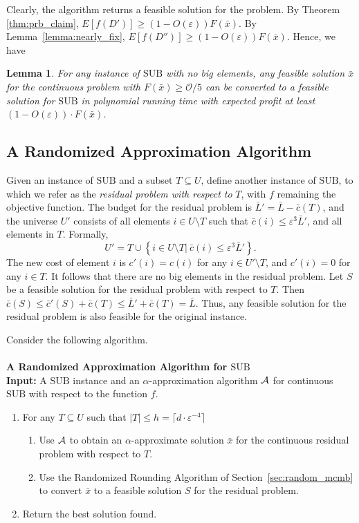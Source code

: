 \documentclass[11pt]{article}
\newtheorem{lemma}[theorem]{Lemma}
\newcommand{\eps}{\varepsilon}
\newcommand{\ceil}[1]{\lceil #1 \rceil }
\newcommand{\bx}{\bar{x}}
\newcommand{\cA}{{\cal A}}
\newcommand{\bL}{\bar{L}}
\newcommand{\bc}{\bar{c}}
\newcommand{\mO}{\mathcal{O}}
\newcommand{\SUB}{\mbox{SUB}}
\begin{document}
{Clearly, the algorithm returns a feasible solution for the problem.
By Theorem \ref{thm:prb_claim}, $E[f(D')] \geq (1- O(\eps)) F(\bar{x})$. By
Lemma~\ref{lemma:nearly_fix},
$E[f(D'')] \geq (1- O(\eps)) F(\bar{x})$. Hence, we have

\begin{lemma}
\label{thm:nobig_alg}
For any instance of $\SUB$ with no big elements,
any feasible solution $\bar{x}$ for the continuous problem with $F(\bar{x}) \geq \mO /5$
can be converted to a feasible solution for $\SUB$ in polynomial running time
with expected profit at least $(1-O(\eps))\cdot F(\bar{x})$.
\end{lemma}


\subsection{A Randomized Approximation Algorithm}
\label{sec:mcmb}


Given an instance of $\SUB$ and a subset $T \subseteq U$,
define another instance of $\SUB$, to which we refer as the {\em residual
problem with respect to} $T$, with $f$ remaining the objective function.
The budget for the residual problem is
${\bL}'={\bL}-{\bc}(T)$,
and the universe $U'$ consists of all elements $i \in U \setminus T$
such that $\bc(i) \leq \eps^3 \bL'$,
and all elements in $T$.
Formally,
$$U' = T \cup \left\{ i\in U\setminus T |~ \bc(i) \leq \eps^3 \bL'\right\}.
$$
The new cost of element $i$ is $c'(i)=c(i)$ for any $i\in U' \setminus T$, and
$c'(i) =0 $ for any $i\in T$. It follows that there
are no big elements in the residual problem.
Let $S$ be a feasible solution for the residual problem with respect
to $T$. Then $\bc(S) \leq \bc'(S) +\bc(T) \leq \bL' +\bc(T) =\bL$. Thus,
any feasible solution for the residual problem is also feasible for
the original instance.

Consider the following algorithm.
\\ \\
\noindent
{\bf A Randomized Approximation Algorithm for $\SUB$}\\
\noindent
{\bf Input:} A $\SUB$ instance and an $\alpha$-approximation algorithm
 $\cA$ for continuous $\SUB$ with respect to
the function $f$.
\begin{enumerate}
\item For any $T \subseteq U$ such that $|T| \leq h=\ceil{d \cdot \eps^{-4}}$
\begin{enumerate}
\item
Use $\cA$ to obtain an $\alpha$-approximate solution $\bx$ for the
continuous residual problem with respect to $T$.
\item Use the Randomized Rounding Algorithm of Section~\ref{sec:random_mcmb}
to convert $\bx$ to a feasible solution $S$ for
the residual problem.
\end{enumerate}
\item Return the best solution found.
\end{enumerate}

}
\end{document}
